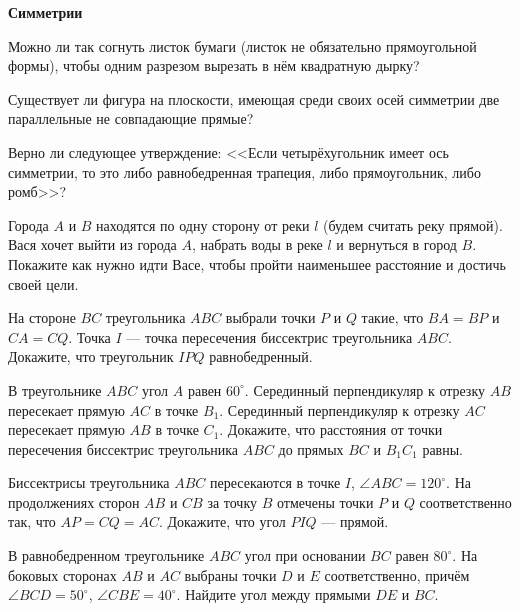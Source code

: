 \documentclass{article}
\begin{document}
    \large

    \begin{center}
        \textbf{Симметрии}
    \end{center}

    \begin{enumerate_boxed}

        \item Можно ли так согнуть листок бумаги (листок не обязательно прямоугольной формы), чтобы одним разрезом вырезать в нём квадратную дырку?

        \item Существует ли фигура на плоскости, имеющая среди своих осей симметрии две параллельные не совпадающие прямые?

        \item Верно ли следующее утверждение: <<Если четырёхугольник имеет ось симметрии, то это либо равнобедренная трапеция, либо прямоугольник, либо ромб>>?

        \item Города $A$ и $B$ находятся по одну сторону от реки $l$ (будем считать реку прямой).
        Вася хочет выйти из города $A$, набрать воды в реке $l$ и вернуться в город $B$.
        Покажите как нужно идти Васе, чтобы пройти наименьшее расстояние и достичь своей цели.

        \item На стороне $BC$ треугольника $ABC$ выбрали точки $P$ и $Q$ такие, что $BA=BP$ и $CA=CQ$.
        Точка $I$ — точка пересечения биссектрис треугольника $ABC$.
        Докажите, что треугольник $IPQ$ равнобедренный.

        \item  В треугольнике $ABC$ угол $A$ равен $60^\circ$.
        Серединный перпендикуляр к отрезку $AB$ пересекает прямую $AC$ в точке $B_1$.
        Серединный перпендикуляр к отрезку $AC$ пересекает прямую $AB$ в точке $C_1$.
        Докажите, что расстояния от точки пересечения биссектрис треугольника $ABC$ до прямых $BC$ и $B_{1}C_1$ равны.

        \item Биссектрисы треугольника $ABC$ пересекаются в точке $I$, $\angle ABC=120^\circ$.
        На продолжениях сторон $AB$ и $CB$ за точку $B$ отмечены точки $P$ и $Q$ соответственно так, что $AP=CQ=AC$.
        Докажите, что угол $PIQ$ — прямой.

        \item В равнобедренном треугольнике $ABC$ угол при основании $BC$ равен $80^\circ$.
        На боковых сторонах $AB$ и $AC$ выбраны точки $D$ и $E$ соответственно, причём $\angle BCD=50^\circ$, $\angle CBE=40^\circ$.
        Найдите угол между прямыми $DE$ и $BC$.


\end{enumerate_boxed}
\end{document}

